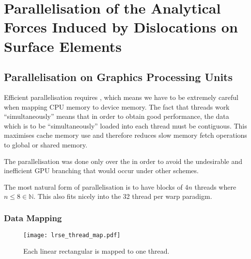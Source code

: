 \chapter{Parallelisation of the Analytical Forces Induced by Dislocations on Surface Elements}
\label{c:para_f_dln_se}
	\section{Parallelisation on Graphics Processing Units}
	Efficient parallelisation requires , which means we have to be extremely careful when mapping CPU memory to device memory. The fact that threads work ``simultaneously'' means that in order to obtain good performance, the data which is to be ``simultaneously'' loaded into each thread must be contiguous. This maximises cache memory use and therefore reduces slow memory fetch operations to global or shared memory.
	
	The parallelisation was done only over the  in order to avoid the undesirable and inefficient GPU branching that would occur under other schemes.
	
	The most natural form of parallelisation is to have blocks of $ 4n $ threads where $ n \leq 8 \in \mathbb{N}$. This also fits nicely into the 32 thread per warp paradigm.
	\subsection{Data Mapping}
		\begin{figure}
			\centering
			\texttt{[image: lrse\_thread\_map.pdf]}
			\caption[Linear rectangular surface element mapping.]{Each linear rectangular  is mapped to one thread.}
			\label{f:lrse_map}
		\end{figure}
